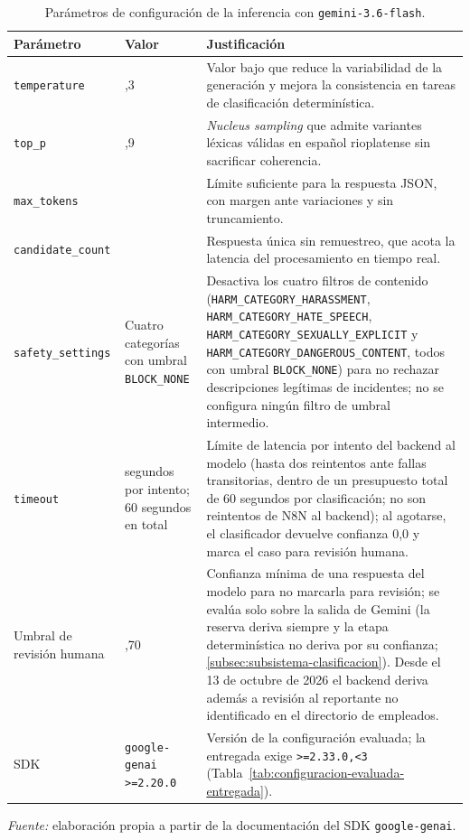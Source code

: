 \begin{table}[htbp]
\small
\centering
\caption{Parámetros de configuración de la inferencia con \texttt{gemini-3.6-flash}.}
\label{tab:anexo_gemini_params}
\begin{tabular}{@{}>{\raggedright\arraybackslash}p{3.0cm} >{\raggedright\arraybackslash}p{2.6cm} >{\raggedright\arraybackslash}p{8.4cm}@{}}
\toprule
Parámetro & Valor & Justificación \\
\midrule
\texttt{temperature} & 0,3 & Valor bajo que reduce la variabilidad de la generación y mejora la consistencia en tareas de clasificación determinística. \\
\texttt{top\_p} & 0,9 & \emph{Nucleus sampling} que admite variantes léxicas válidas en español rioplatense sin sacrificar coherencia. \\
\texttt{max\_tokens} & 100 & Límite suficiente para la respuesta JSON, con margen ante variaciones y sin truncamiento. \\
\texttt{candidate\_count} & 1 & Respuesta única sin remuestreo, que acota la latencia del procesamiento en tiempo real. \\
\texttt{safety\_settings} & Cuatro categorías con umbral \texttt{BLOCK\_NONE} & Desactiva los cuatro filtros de contenido (\texttt{HARM\_CATEGORY\_HARASSMENT}, \texttt{HARM\_CATEGORY\_HATE\_SPEECH}, \texttt{HARM\_CATEGORY\_SEXUALLY\_EXPLICIT} y \texttt{HARM\_CATEGORY\_DANGEROUS\_CONTENT}, todos con umbral \texttt{BLOCK\_NONE}) para no rechazar descripciones legítimas de incidentes; no se configura ningún filtro de umbral intermedio. \\
\texttt{timeout} & 30 segundos por intento; 60 segundos en total & Límite de latencia por intento del backend al modelo (hasta dos reintentos ante fallas transitorias, dentro de un presupuesto total de 60 segundos por clasificación; no son reintentos de N8N al backend); al agotarse, el clasificador devuelve confianza 0,0 y marca el caso para revisión humana. \\
Umbral de revisión humana & 0,70 & Confianza mínima de una respuesta del modelo para no marcarla para revisión; se evalúa solo sobre la salida de Gemini (la reserva deriva siempre y la etapa determinística no deriva por su confianza; \autoref{subsec:subsistema-clasificacion}). Desde el 13 de octubre de 2026 el backend deriva además a revisión al reportante no identificado en el directorio de empleados. \\
SDK & \texttt{google-genai} \texttt{>=2.20.0} & Versión de la configuración evaluada; la entregada exige \texttt{>=2.33.0,<3} (Tabla~\ref{tab:configuracion-evaluada-entregada}). \\
\bottomrule
\end{tabular}
{\footnotesize\textit{Fuente:} elaboración propia a partir de la documentación del SDK \texttt{google-genai}.\par}
\end{table}

